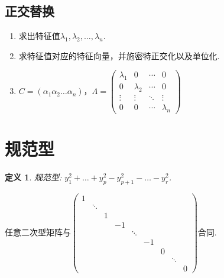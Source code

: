 \documentclass[12pt, a4paper, oneside]{ctexbook}
\newtheorem{definition}[theorem]{定义}
\begin{document}
\subsection{正交替换}

\begin{enumerate}
    \item 求出特征值$\lambda_1, \lambda_2, \dots, \lambda_n$. 
    \item 求特征值对应的特征向量，并施密特正交化以及单位化. 
    \item $C=(\alpha_1 \alpha_2 \dots \alpha_n)$，$\Lambda=\begin{pmatrix}
        \lambda_1 & 0          & \cdots & 0 \\
        0         & \lambda_2  & \cdots & 0 \\
        \vdots    & \vdots     & \ddots & \vdots \\
        0         & 0 & \cdots & \lambda_n
    \end{pmatrix}$
\end{enumerate}

\section{规范型}

\begin{definition}
    规范型: $y_1^2 + \dots + y_p^2 - y_{p+1}^2 - \dots - y_r^2$. 
\end{definition}

任意二次型矩阵与$\begin{pmatrix}
    1 \\
     & \ddots \\
     &  & 1 \\
     &  &  & -1 \\
     &  &  &  & \ddots \\
     &  &  &  &  & -1 \\
     &  &  &  &  &  & 0 \\
     &  &  &  &  &  &  & \ddots \\
     &  &  &  &  &  &  &  & 0
\end{pmatrix}$合同. 
\end{document}
